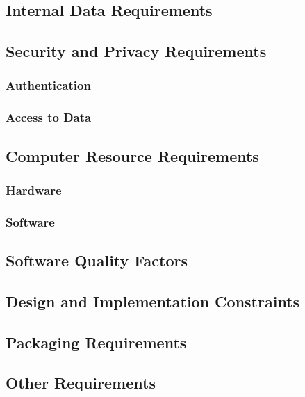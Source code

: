 \documentclass[11pt]{article}
\begin{document}
\subsection{Internal Data Requirements}

\subsection{Security and Privacy Requirements}
\subsubsection{Authentication}

\subsubsection{Access to Data}

\subsection{Computer Resource Requirements}
\subsubsection{Hardware}

\subsubsection{Software}

\subsection{Software Quality Factors}

\subsection{Design and Implementation Constraints}

\subsection{Packaging Requirements}

\subsection{Other Requirements}
\end{document}

